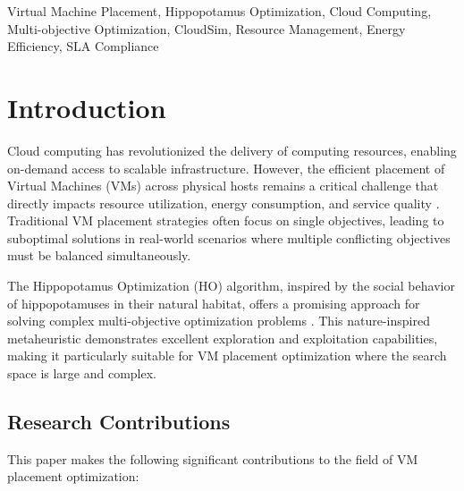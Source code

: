 \documentclass[conference]{IEEEtran}
\begin{document}
\begin{IEEEkeywords}
Virtual Machine Placement, Hippopotamus Optimization, Cloud Computing, Multi-objective Optimization, CloudSim, Resource Management, Energy Efficiency, SLA Compliance
\end{IEEEkeywords}

\section{Introduction}

Cloud computing has revolutionized the delivery of computing resources, enabling on-demand access to scalable infrastructure. However, the efficient placement of Virtual Machines (VMs) across physical hosts remains a critical challenge that directly impacts resource utilization, energy consumption, and service quality \cite{cloudsim2016}. Traditional VM placement strategies often focus on single objectives, leading to suboptimal solutions in real-world scenarios where multiple conflicting objectives must be balanced simultaneously.

The Hippopotamus Optimization (HO) algorithm, inspired by the social behavior of hippopotamuses in their natural habitat, offers a promising approach for solving complex multi-objective optimization problems \cite{hippopotamus2023}. This nature-inspired metaheuristic demonstrates excellent exploration and exploitation capabilities, making it particularly suitable for VM placement optimization where the search space is large and complex.

\subsection{Research Contributions}

This paper makes the following significant contributions to the field of VM placement optimization:
\end{document}
